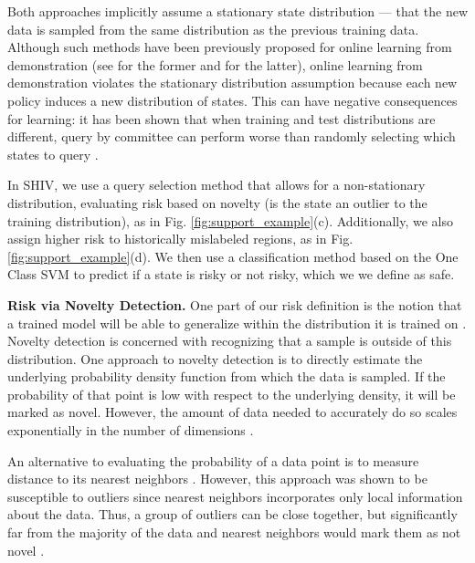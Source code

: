 \documentclass[10pt, conference]{ieeeconf}      %
\begin{document}
Both approaches implicitly assume a stationary state distribution --- that the new data is sampled from the same distribution as the previous training data. Although such methods have been previously proposed for online learning from demonstration (see \cite{chernova2009interactive,grollman2007dogged} for the former and \cite{judah2011active,judah2012active} for the latter),
online learning from demonstration violates the stationary distribution assumption because each new policy induces a new distribution of states. This can have negative consequences for learning: it has been shown that when training and test distributions are different, query by committee can perform worse than randomly selecting  which states to query \cite{burbidge2007active}.

In SHIV, we use a query selection method that allows for a non-stationary distribution, evaluating risk based on novelty (is the state an outlier to the training distribution), as in Fig. \ref{fig:support_example}(c). Additionally, we also assign higher risk to  historically mislabeled regions, as in Fig. \ref{fig:support_example}(d). We then use a classification method based on the One Class SVM \cite{scholkopf2001estimating} to predict if a state is risky or not risky, which we we define as safe.%

\noindent\textbf{Risk via Novelty Detection.}
One part of our risk definition is the notion that a trained model will be able to generalize within the distribution it is
trained on \cite{tokdar2010importance}. Novelty detection \cite{hodge2004survey} is concerned with recognizing that a sample is outside of this distribution.
One approach to novelty detection is to directly estimate the underlying probability density function from which the data is sampled. If the probability of that point is low with respect to the underlying density, it will be marked as novel. However, the amount of data needed to accurately do so scales exponentially in the number of dimensions \cite{nadaraya1964estimating}.

An alternative to evaluating the probability of a data point is to measure distance to its nearest neighbors \cite{knox1998algorithms}. However, this approach was shown to be
susceptible to outliers since nearest neighbors  incorporates only local information about the data. Thus, a group of outliers can be close together, but significantly far from the majority of the data and nearest neighbors would mark them as not novel \cite{hodge2004survey}.
\end{document}
